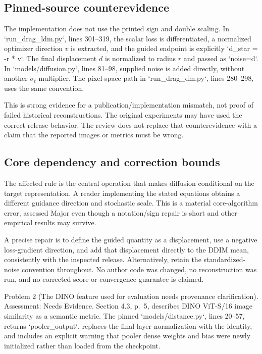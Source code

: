 \documentclass[10pt]{article}
\begin{document}
\subsection*{Pinned-source counterevidence}
The implementation does not use the printed sign and double scaling. In `run\_drag\_ldm.py`, lines 301–319, the scalar loss is differentiated, a normalized optimizer direction \(v\) is extracted, and the guided endpoint is explicitly `d\_star = -r * v`. The final displacement \(d\) is normalized to radius \(r\) and passed as `noise=d`. In `models/diffusion.py`, lines 81–98, supplied noise is added directly, without another \(\sigma_t\) multiplier. The pixel-space path in `run\_drag\_dm.py`, lines 280–298, uses the same convention.\par
This is strong evidence for a publication/implementation mismatch, not proof of failed historical reconstructions. The original experiments may have used the correct release behavior. The review does not replace that counterevidence with a claim that the reported images or metrics must be wrong.\par
\subsection*{Core dependency and correction bounds}
The affected rule is the central operation that makes diffusion conditional on the target representation. A reader implementing the stated equations obtains a different guidance direction and stochastic scale. This is a material core-algorithm error, assessed Major even though a notation/sign repair is short and other empirical results may survive.\par
A precise repair is to define the guided quantity as a displacement, use a negative loss-gradient direction, and add that displacement directly to the DDIM mean, consistently with the inspected release. Alternatively, retain the standardized-noise convention throughout. No author code was changed, no reconstruction was run, and no corrected score or convergence guarantee is claimed.\par
Problem 2 (The DINO feature used for evaluation needs provenance clarification).  Assessment: Needs Evidence. Section 4.3, p. 5, describes DINO ViT-S/16 image similarity as a semantic metric. The pinned `models/distance.py`, lines 20–57, returns `pooler\_output`, replaces the final layer normalization with the identity, and includes an explicit warning that pooler dense weights and bias were newly initialized rather than loaded from the checkpoint.\par
\end{document}
